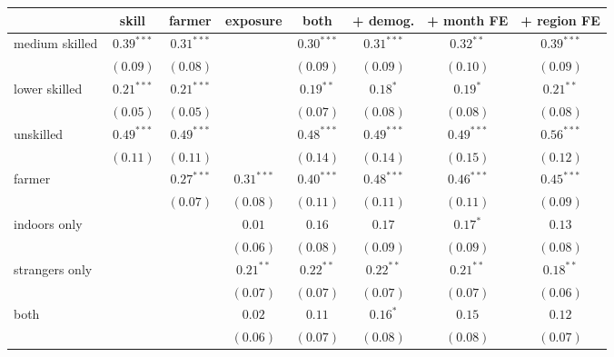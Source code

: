 
\begin{table}
\begin{center}
\begin{tabular}{l c c c c c c c}
\hline
 & skill & farmer & exposure & both & + demog. & + month FE & + region FE \\
\hline
medium skilled & $0.39^{***}$ & $0.31^{***}$ &              & $0.30^{***}$ & $0.31^{***}$  & $0.32^{**}$   & $0.39^{***}$  \\
               & $(0.09)$     & $(0.08)$     &              & $(0.09)$     & $(0.09)$      & $(0.10)$      & $(0.09)$      \\
lower skilled  & $0.21^{***}$ & $0.21^{***}$ &              & $0.19^{**}$  & $0.18^{*}$    & $0.19^{*}$    & $0.21^{**}$   \\
               & $(0.05)$     & $(0.05)$     &              & $(0.07)$     & $(0.08)$      & $(0.08)$      & $(0.08)$      \\
unskilled      & $0.49^{***}$ & $0.49^{***}$ &              & $0.48^{***}$ & $0.49^{***}$  & $0.49^{***}$  & $0.56^{***}$  \\
               & $(0.11)$     & $(0.11)$     &              & $(0.14)$     & $(0.14)$      & $(0.15)$      & $(0.12)$      \\
farmer         &              & $0.27^{***}$ & $0.31^{***}$ & $0.40^{***}$ & $0.48^{***}$  & $0.46^{***}$  & $0.45^{***}$  \\
               &              & $(0.07)$     & $(0.08)$     & $(0.11)$     & $(0.11)$      & $(0.11)$      & $(0.09)$      \\
indoors only   &              &              & $0.01$       & $0.16$       & $0.17$        & $0.17^{*}$    & $0.13$        \\
               &              &              & $(0.06)$     & $(0.08)$     & $(0.09)$      & $(0.09)$      & $(0.08)$      \\
strangers only &              &              & $0.21^{**}$  & $0.22^{**}$  & $0.22^{**}$   & $0.21^{**}$   & $0.18^{**}$   \\
               &              &              & $(0.07)$     & $(0.07)$     & $(0.07)$      & $(0.07)$      & $(0.06)$      \\
both           &              &              & $0.02$       & $0.11$       & $0.16^{*}$    & $0.15$        & $0.12$        \\
               &              &              & $(0.06)$     & $(0.07)$     & $(0.08)$      & $(0.08)$      & $(0.07)$      \\

\end{tabular}
\end{center}
\end{table}
